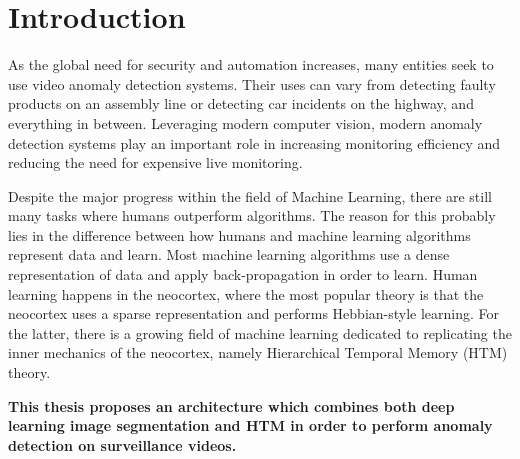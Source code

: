 \chapter{Introduction}
As the global need for security and automation increases, many entities seek to use video anomaly detection systems. Their uses can vary from detecting faulty products on an assembly line or detecting car incidents on the highway, and everything in between. Leveraging modern computer vision, modern anomaly detection systems play an important role in increasing monitoring efficiency and reducing the need for expensive live monitoring.\par
Despite the major progress within the field of Machine Learning, there are still many tasks where humans outperform algorithms. The reason for this probably lies in the difference between how humans and machine learning algorithms represent data and learn. Most machine learning algorithms use a dense representation of data and apply back-propagation in order to learn. Human learning happens in the neocortex, where the most popular theory is that the neocortex uses a sparse representation and performs Hebbian-style learning. For the latter, there is a growing field of machine learning dedicated to replicating the inner mechanics of the neocortex, namely Hierarchical Temporal Memory (HTM) theory. \par
\textbf{This thesis proposes an architecture which combines both deep learning image segmentation and HTM in order to perform anomaly detection on surveillance videos. }

